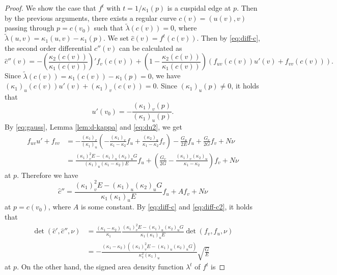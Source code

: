 \documentclass[10pt,a4paper]{amsart}
\newcommand{\til}{\tilde}
\begin{document}
\begin{proof}
	We show the case that $f^t$ with $t=1/\kappa_1(p)$ 
	is a cuspidal edge at $p$. 
	Then by the previous arguments, there exists a regular curve $c(v)=(u(v),v)$ 
	passing through $p=c(v_0)$ such that $\til{\lambda}(c(v))=0$, 
	where $\til{\lambda}(u,v)=\kappa_1(u,v)-\kappa_1(p)$. 
	We set $\hat{c}(v)=f^t(c(v))$. 
	Then by \eqref{eq:diff-c}, the second order differential $\hat{c}''(v)$ can be calculated as 
	\[
	\hat{c}''(v)=-\left(\frac{\kappa_2(c(v))}{\kappa_1(c(v))}\right)'f_v(c(v))
	+\left(1-\frac{\kappa_2(c(v))}{\kappa_1(c(v))}\right)(f_{uv}(c(v))u'(v)+f_{vv}(c(v))).
	\]
	Since $\til{\lambda}(c(v))=\kappa_1(c(v))-\kappa_1(p)=0$, we have 
	\(
	(\kappa_1)_u(c(v))u'(v)+(\kappa_1)_v(c(v))=0
	\). 
	Since $(\kappa_1)_u(p)\neq0$, it holds that 
	\begin{equation}\label{eq:du2}
		u'(v_0)=-\frac{(\kappa_1)_v(p)}{(\kappa_1)_u(p)}.
	\end{equation}
	By \eqref{eq:gauss}, Lemma \ref{lem:d-kappa} and \eqref{eq:du2}, 
	we get
	\[
	\begin{aligned}
		f_{uv}u'+f_{vv}
		&=-\frac{(\kappa_1)_v}{(\kappa_1)_u}
		\left(-\frac{(\kappa_1)_v}{\kappa_1-\kappa_2}f_u
		+\frac{(\kappa_2)_u}{\kappa_1-\kappa_2}f_v\right)
		-\frac{G_u}{2E}f_u+\frac{G_v}{2G}f_v+N\nu\\
		&=\frac{(\kappa_1)_v^2E-(\kappa_1)_u(\kappa_2)_uG}{(\kappa_1)_u(\kappa_1-\kappa_2)E}f_u
		+\left(\frac{G_v}{2G}-\frac{(\kappa_1)_v(\kappa_2)_u}{\kappa_1-\kappa_2}\right)f_v+N\nu
	\end{aligned}
	\]
	at $p$. 
	Therefore we have 
	\begin{equation}\label{eq:diff-c2}
		\hat{c}''=\frac{(\kappa_1)_v^2E-(\kappa_1)_u(\kappa_2)_uG}{\kappa_1(\kappa_1)_uE}f_u
		+Af_v+N\nu
	\end{equation}
	at $p=c(v_0)$, where $A$ is some constant. 
	By \eqref{eq:diff-c} and \eqref{eq:diff-c2}, it holds that 
	\begin{equation}\label{eq:det-para}
		\begin{aligned}
		\det(\hat{c}',\hat{c}'',\nu)
		&=\frac{(\kappa_1-\kappa_2)}{\kappa_1}\frac{(\kappa_1)_v^2E-(\kappa_1)_u(\kappa_2)_uG}{\kappa_1(\kappa_1)_uE}
		\det(f_v,f_u,\nu)\\
		&=-\frac{(\kappa_1-\kappa_2)((\kappa_1)_v^2E-(\kappa_1)_u(\kappa_2)_uG)}
		{\kappa_1^2(\kappa_1)_u}\sqrt{\frac{G}{E}}
		\end{aligned}
	\end{equation}
	at $p$. 
	On the other hand, the signed area density function $\lambda^t$ of $f^t$ is 

\end{proof}
\end{document}
